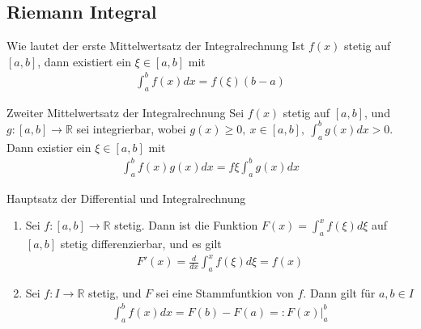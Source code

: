 \subsection{Riemann Integral}

\begin{karte}{Wie lautet der erste Mittelwertsatz der Integralrechnung}
	Ist \(f(x)\) stetig auf \([a,b]\), dann existiert ein \(\xi\in[a,b]\) mit
	\begin{align}
		\int_{a}^{b}f(x)dx=f(\xi)(b-a)
	\end{align}
\end{karte}

\begin{karte}{Zweiter Mittelwertsatz der Integralrechnung}
	Sei \(f(x)\) stetig auf \([a,b]\), und \(g:[a,b]\to \mathbb{R}\) sei integrierbar, wobei \(g(x)\geq0,\ x\in[a,b],\ \int_{a}^{b} g(x)dx>0\). Dann existier ein \(\xi\in[a,b]\) mit
	\begin{align}
		\int_{a}^{b} f(x)g(x)dx=f{\xi}\int_{a}^{b} g(x)dx
	\end{align}
\end{karte}


\begin{karte}{Hauptsatz der Differential und Integralrechnung}
	\begin{enumerate}[label= (\roman*)]

		\item Sei \(f:[a,b] \to \mathbb{R}\) stetig. Dann ist die Funktion \(F(x) = \int_a^x f(\xi)d\xi \) auf \([a,b]\) stetig differenzierbar, und es gilt
		      \begin{align}
		      	F'(x) = \frac{d}{dx} \int_a^x f(\xi)d\xi=f(x)
		      \end{align}

		\item Sei \(f: I \to \mathbb{R}\) stetig, und \(F\) sei eine Stammfuntkion von \(f\). Dann gilt für \(a,b \in I\)
		      \begin{align}
		      	\int_a^b f(x)dx = F(b) - F(a) =: F(x)|_a^b
		      \end{align}
	\end{enumerate}
\end{karte}
